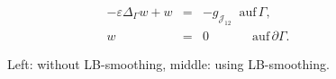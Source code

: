 \documentclass[8pt]{beamer}
\newcommand{\JJ }{ \mathcal{J}}
\begin{document}
{\begin{figure}[htbp]
\begin{minipage}[b]{3.9 cm}
\begin{footnotesize}
\begin{eqnarray*}
 -\varepsilon \Delta_\Gamma w + w &=&  -g_{\JJ_{12}}  \;\; \mbox{auf}\, \Gamma,\\
w &=& 0 \qquad \quad \,\; \mbox{auf}\, \partial \Gamma.
\end{eqnarray*} 
\end{footnotesize}
\end{minipage}
  \caption{Left: without LB-smoothing, middle: using LB-smoothing.}
\end{figure}
}
%
%
%
\end{document}

